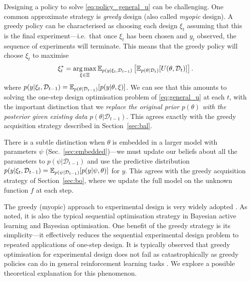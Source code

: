 \documentclass[a4paper, 10pt]{report}
\theoremstyle{plain}
\begin{document}
	Designing a policy to solve \eqref{eq:policy_general_u} can be challenging. 
	One common approximate strategy is \emph{greedy} design (also called \emph{myopic} design).
	A greedy policy can be characterised as choosing each design $\xi_t$ assuming that this is the final experiment---i.e.~that once $\xi_t$ has been chosen and $y_t$ observed, the sequence of experiments will terminate.
	This means that the greedy policy will choose $\xi_t$ to maximise 
	\begin{equation}
	\label{eq:greedy_general_u}
	\xi_t^* = \operatorname*{arg\,max}_{\xi\in\Xi} \mathbb{E}_{p(y|\xi_t,\mathcal{D}_{t-1})}\left[ \mathbb{E}_{p(\theta|\mathcal{D}_t)}[U(\theta,\mathcal{D}_t)] \right].
	\end{equation}
	where $p(y|\xi_t,\mathcal{D}_{t-1}) = \mathbb{E}_{p(\theta|\mathcal{D}_{t-1})}[p(y|\theta,\xi)]$.
	We can see that this amounts to solving the one-step design optimisation problem of \eqref{eq:general_u} at each $t$, with the important distinction that we \emph{replace the original prior $p(\theta)$ with the posterior given existing data $p(\theta|\mathcal{D}_{t-1})$}.
	This agrees exactly with the greedy acquisition strategy described in Section~\ref{sec:bal}.
	
	There is a subtle distinction when $\theta$ is embedded in a larger model with parameters $\psi$ (Sec.~\ref{sec:embedded})---we must update our beliefs about all the parameters to $p(\psi|\mathcal{D}_{t-1})$ and use the predictive distribution $p(y|\xi_t,\mathcal{D}_{t-1}) = \mathbb{E}_{p(\psi|\mathcal{D}_{t-1})}[p(y|\psi,\theta)]$ for $y$.
	This agrees with the greedy acquisition strategy of Section~\ref{sec:bo}, where we update the full model on the unknown function $f$ at each step.
	
	The greedy (myopic) approach to experimental design is very widely adopted \citep{cavagnaro2010adaptive,drovandi2014sequential,mcgree2012adaptive,myung2013,foster2019variational}.
	As noted, it is also the typical sequential optimisation strategy in Bayesian active learning and Bayesian optimisation.
	One benefit of the greedy strategy is its simplicity---it effectively reduces the sequential experimental design problem to repeated applications of one-step design.
	It is typically observed that greedy optimisation for experimental design does not fail as catastrophically as greedy policies can do in general reinforcement learning tasks \citep{bakker2020experimental}.
	We explore a possible theoretical explanation for this phenomenon.
	
	
\end{document}
